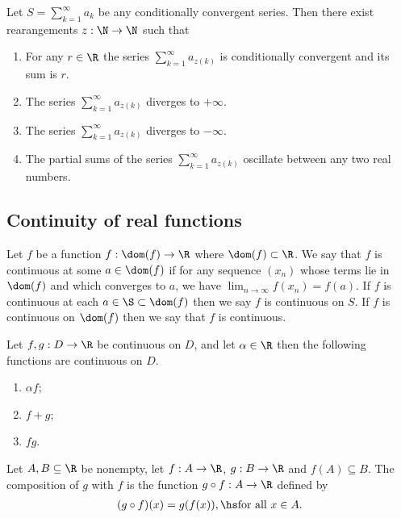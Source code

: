 \documentclass{article}
\begin{document}
\begin{theorem}[Notes 1.9]
	Let $S=\sum_{k=1}^\infty a_k$ be any conditionally convergent series. Then there
	exist rearangements $z:\N\to\N$ such that
	\begin{enumerate}
		\item For any $r\in\R$ the series $\sum_{k=1}^\infty a_{z(k)}$ is conditionally
		      convergent and its sum is $r$.
		\item The series $\sum_{k=1}^\infty a_{z(k)}$ diverges to $+\infty$.
		\item The series $\sum_{k=1}^\infty a_{z(k)}$ diverges to $-\infty$.
		\item The partial sums of the series $\sum_{k=1}^\infty a_{z(k)}$ oscillate between any two real numbers.
	\end{enumerate}
\end{theorem}

\subsection{Continuity of real functions}

\begin{definition}
	Let $f$ be a function $f:\dom(f)\to\R$ where $\dom(f)\subset\R$. We say that $f$ is
	continuous at some $a\in\dom(f)$ if for any sequence $(x_n)$ whose terms lie in
	$\dom(f)$ and which converges to $a$, we have $\lim_{n\to\infty}f(x_n)=f(a)$. If
	$f$ is continuous at each $a\in\S\subset\dom(f)$ then we say $f$ is continuous on $S$.
	If $f$ is continuous on $\dom(f)$ then we say that $f$ is continuous.
\end{definition}

\begin{theorem}[Notes 1.10]
	Let $f,g:D\to\R$ be continuous on $D$, and let $\alpha\in\R$ then the following functions
	are continuous on $D$.
	\begin{enumerate}
		\item $\alpha f$;
		\item $f+g$;
		\item $fg$.
	\end{enumerate}
\end{theorem}

\begin{definition}
	Let $A,B\subseteq\R$ be nonempty, let $f:A\to\R$, $g:B\to\R$ and $f(A)\subseteq B$. The
	composition of $g$ with $f$ is the function $g\circ f:A\to\R$ defined by
	\begin{align*}
		(g\circ f)(x) = g(f(x)),\hs \text{for all }x\in A.
	\end{align*}
\end{definition}
\end{document}
